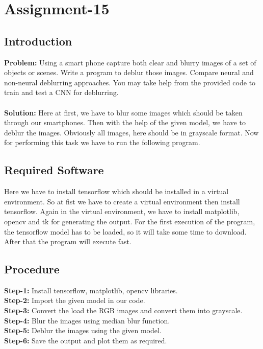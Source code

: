 \documentclass{article}
\begin{document}
{
    \section{Assignment-15}
    \subsection{Introduction}
    \textbf {Problem: }
    Using a smart phone capture both clear and blurry images of a set of objects or scenes. Write a program to deblur those images. Compare neural and non-neural deblurring approaches. You may take help from the provided code to train and test a CNN for deblurring.\\
    \\
    \textbf{Solution: }
    Here at first, we have to blur some images which should be taken through our smartphones. Then with the help of the given model, we have to deblur the images. Obviously all images, here should be in grayscale format. Now for performing this task we have to run the following program.\\
    
    \subsection{Required Software}
    Here we have to install tensorflow which should be installed in a virtual environment. So at fist we have to create a virtual environment then install tensorflow. Again in the virtual environment, we have to install matplotlib, opencv and tk for generating the output. For the first execution of the program, the tensorflow model has to be loaded, so it will take some time to download. After that the program will execute fast.\\
    
    \subsection{Procedure}
    \textbf{Step-1:}
    Install tensorflow, matplotlib, opencv libraries.\\
    \textbf{Step-2:}
    Import the given model in our code.\\
    \textbf{Step-3:}
    Convert the load the RGB images and convert them into grayscale.\\
    \textbf{Step-4:}
    Blur the images using median blur function.\\
    \textbf{Step-5:}
    Deblur the images using the given model.\\
    \textbf{Step-6:}
    Save the output and plot them as required.\\
    
}
\end{document}

